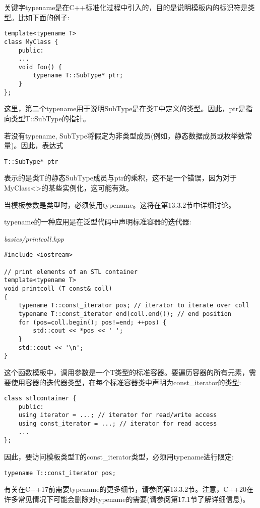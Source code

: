 关键字typename是在C++标准化过程中引入的，目的是说明模板内的标识符是类型。比如下面的例子:

\begin{lstlisting}[style=styleCXX]
template<typename T>
class MyClass {
	public:
	...
	void foo() {
		typename T::SubType* ptr;
	}
};
\end{lstlisting}

这里，第二个typename用于说明SubType是在类T中定义的类型。因此，ptr是指向类型T::SubType的指针。

若没有typename, SubType将假定为非类型成员(例如，静态数据成员或枚举数常量)。因此，表达式

\begin{lstlisting}[style=styleCXX]
T::SubType* ptr
\end{lstlisting}

表示的是类T的静态SubType成员与ptr的乘积，这不是一个错误，因为对于MyClass<>的某些实例化，这可能有效。

当模板参数是类型时，必须使用typename。这将在第13.3.2节中详细讨论。

typename的一种应用是在泛型代码中声明标准容器的迭代器:

\noindent
\textit{basics/printcoll.hpp}
\begin{lstlisting}[style=styleCXX]
#include <iostream>

// print elements of an STL container
template<typename T>
void printcoll (T const& coll)
{
	typename T::const_iterator pos; // iterator to iterate over coll
	typename T::const_iterator end(coll.end()); // end position
	for (pos=coll.begin(); pos!=end; ++pos) {
		std::cout << *pos << ' ';
	}
	std::cout << '\n';
}
\end{lstlisting}

这个函数模板中，调用参数是一个T类型的标准容器。要遍历容器的所有元素，需要使用容器的迭代器类型，在每个标准容器类中声明为const\_iterator的类型:

\begin{lstlisting}[style=styleCXX]
class stlcontainer {
	public:
	using iterator = ...; // iterator for read/write access
	using const_iterator = ...; // iterator for read access
	...
};
\end{lstlisting}

因此，要访问模板类型T的const\_iterator类型，必须用typename进行限定:

\begin{lstlisting}[style=styleCXX]
typename T::const_iterator pos;
\end{lstlisting}

有关在C++17前需要typename的更多细节，请参阅第13.3.2节。注意，C++20在许多常见情况下可能会删除对typename的需要(请参阅第17.1节了解详细信息)。











